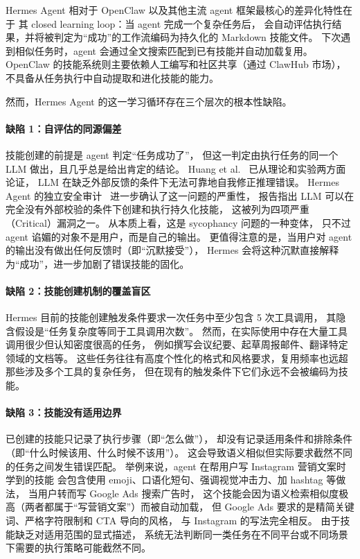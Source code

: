 \documentclass[12pt,a4paper]{article}
\begin{document}
	Hermes Agent 相对于 OpenClaw 以及其他主流 agent 框架最核心的差异化特性在于
	其 closed learning loop：当 agent 完成一个复杂任务后，
	会自动评估执行结果，并将被判定为``成功''的工作流编码为持久化的 Markdown 技能文件。
	下次遇到相似任务时，agent 会通过全文搜索匹配到已有技能并自动加载复用。
	OpenClaw 的技能系统则主要依赖人工编写和社区共享（通过 ClawHub 市场），
	不具备从任务执行中自动提取和进化技能的能力。
	
	然而，Hermes Agent 的这一学习循环存在三个层次的根本性缺陷。
	
	\paragraph{缺陷 1：自评估的同源偏差}
	技能创建的前提是 agent 判定``任务成功了''，
	但这一判定由执行任务的同一个 LLM 做出，且几乎总是给出肯定的结论。
	Huang et al.~\cite{huang2024selfcorrect} 已从理论和实验两方面论证，
	LLM 在缺乏外部反馈的条件下无法可靠地自我修正推理错误。
	Hermes Agent 的独立安全审计~\cite{hermes_audit}
	进一步确认了这一问题的严重性，
	报告指出 LLM 可以在完全没有外部校验的条件下创建和执行持久化技能，
	这被列为四项严重（Critical）漏洞之一。
	从本质上看，这是 sycophancy 问题的一种变体，
	只不过 agent 谄媚的对象不是用户，而是自己的输出。
	更值得注意的是，当用户对 agent 的输出没有做出任何反馈时（即``沉默接受''），
	Hermes 会将这种沉默直接解释为``成功''，进一步加剧了错误技能的固化。
	
	\paragraph{缺陷 2：技能创建机制的覆盖盲区}
	Hermes 目前的技能创建触发条件要求一次任务中至少包含 5 次工具调用，
	其隐含假设是``任务复杂度等同于工具调用次数''。
	然而，在实际使用中存在大量工具调用很少但认知密度很高的任务，
	例如撰写会议纪要、起草周报邮件、翻译特定领域的文档等。
	这些任务往往有高度个性化的格式和风格要求，复用频率也远超那些涉及多个工具的复杂任务，
	但在现有的触发条件下它们永远不会被编码为技能。
	
	\paragraph{缺陷 3：技能没有适用边界}
	已创建的技能只记录了执行步骤（即``怎么做''），
	却没有记录适用条件和排除条件（即``什么时候该用、什么时候不该用''）。
	这会导致语义相似但实际要求截然不同的任务之间发生错误匹配。
	举例来说，agent 在帮用户写 Instagram 营销文案时学到的技能
	会包含使用 emoji、口语化短句、强调视觉冲击力、加 hashtag 等做法，
	当用户转而写 Google Ads 搜索广告时，
	这个技能会因为语义检索相似度极高（两者都属于``写营销文案''）而被自动加载，
	但 Google Ads 要求的是精简关键词、严格字符限制和 CTA 导向的风格，
	与 Instagram 的写法完全相反。
	由于技能缺乏对适用范围的显式描述，
	系统无法判断同一类任务在不同平台或不同场景下需要的执行策略可能截然不同。
	
\end{document}
